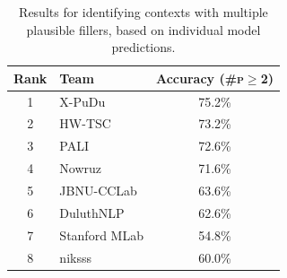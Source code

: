 \documentclass[11pt]{article}
\begin{document}
\begin{table}
    \centering
    \begin{tabular}{clc}
    \toprule
    Rank & Team & Accuracy (\#\textsc{p}$\ge$2)\\
    \midrule
    1 & X-PuDu       & 75.2\% \\ %
    2 & HW-TSC       & 73.2\% \\
    3 & PALI         & 72.6\% \\ %
    4 & Nowruz       & 71.6\% \\
    5 & JBNU-CCLab   & 63.6\% \\
    6 & DuluthNLP    & 62.6\% \\
    7 & Stanford MLab& 54.8\% \\
    8 & niksss       & 60.0\% \\
 \bottomrule
    \end{tabular}
    \caption{Results for identifying contexts with multiple plausible fillers, based on individual model predictions.}
    \label{tab:multiple}
\end{table}
\end{document}

